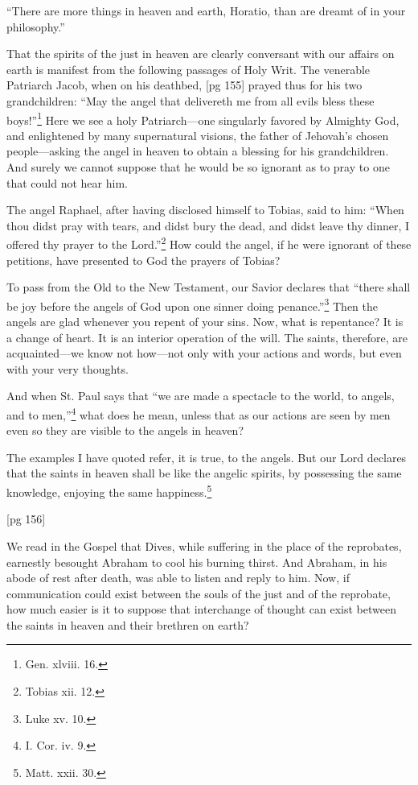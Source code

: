 “There are more things in heaven and earth,
Horatio, than are dreamt of in your philosophy.”

That the spirits of the just in heaven are clearly
conversant with our affairs on earth is manifest
from the following passages of Holy Writ. The
venerable Patriarch Jacob, when on his deathbed,
[pg 155]
prayed thus for his two grandchildren: “May
the angel that delivereth me from all evils bless
these boys!”\footnote{Gen. xlviii.
16.} Here we see a holy Patriarch—one
singularly favored by Almighty God, and enlightened
by many supernatural visions, the father
of Jehovah's chosen people—asking the angel in
heaven to obtain a blessing for his grandchildren.
And surely we cannot suppose that he would be so
ignorant as to pray to one that could not hear him.

The angel Raphael, after having disclosed himself
to Tobias, said to him: “When thou didst
pray with tears, and didst bury the dead, and didst
leave thy dinner, I offered thy prayer to the
Lord.”\footnote{Tobias xii.
12.} How could the angel, if he were ignorant
of these petitions, have presented to God the prayers
of Tobias?

To pass from the Old to the New Testament, our
Savior declares that “there shall be joy before the
angels of God upon one sinner doing
penance.”\footnote{Luke xv. 10.}
Then the angels are glad whenever you repent of
your sins. Now, what is repentance? It is a change
of heart. It is an interior operation of the will.
The saints, therefore, are acquainted—we know
not how—not only with your actions and words,
but even with your very thoughts.

And when St. Paul says that “we are made a
spectacle to the world, to angels, and to
men,”\footnote{I. Cor. iv. 9.}
what does he mean, unless that as our actions are
seen by men even so they are visible to the angels
in heaven?

The examples I have quoted refer, it is true, to
the angels. But our Lord declares that the saints
in heaven shall be like the angelic spirits, by possessing
the same knowledge, enjoying the same
happiness.\footnote{Matt. xxii. 30.}

[pg 156]

We read in the Gospel that Dives, while suffering
in the place of the reprobates, earnestly besought
Abraham to cool his burning thirst. And
Abraham, in his abode of rest after death, was
able to listen and reply to him. Now, if communication
could exist between the souls of the just and
of the reprobate, how much easier is it to suppose
that interchange of thought can exist between the
saints in heaven and their brethren on earth?


